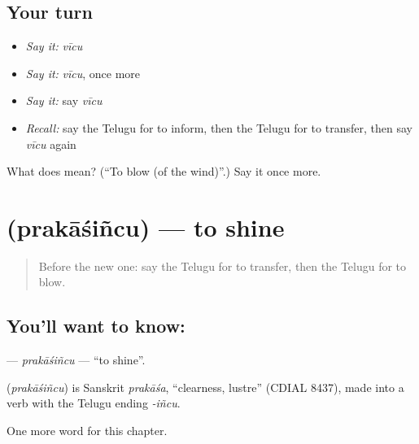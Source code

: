 \subsection*{Your turn}
\begin{itemize}
\raggedright
  \item \emph{Say it:} \emph{vīcu}
  \item \emph{Say it:} \emph{vīcu}, once more
  \item \emph{Say it:} say \emph{vīcu}
  \item \emph{Recall:} say the Telugu for to inform, then the Telugu for to transfer, then say \emph{vīcu} again
\end{itemize}

\begin{tcolorbox}[breakable,colback=teal!4,colframe=teal!35!black,title={Before you move on}]
What does  mean? (\textquotedblleft{}To blow (of the wind)\textquotedblright{}.) Say it once more.
\end{tcolorbox}
\section[\texorpdfstring{\te{ప్రకాశించు} (prakāśiñcu)}{ప్రకాశించు (prakāśiñcu)}]{ (prakāśiñcu) — to shine}

\label{lesson:TE-C244-prakasincu}



\begin{quote}
Before the new one: say the Telugu for to transfer, then the Telugu for to blow.
\end{quote}

\subsection*{You'll want to know: }
\textbf{} — \emph{prakāśiñcu} — \textquotedblleft{}to shine\textquotedblright{}.

\begin{cousinweb}
\textbf{} (\emph{prakāśiñcu}) is Sanskrit \emph{prakāśa}, \textquotedblleft{}clearness, lustre\textquotedblright{} (CDIAL 8437), made into a verb with the Telugu ending \emph{-iñcu}.
\end{cousinweb}

\begin{grammarlens}[title={What you've built}]
One more word for this chapter.
\end{grammarlens}


